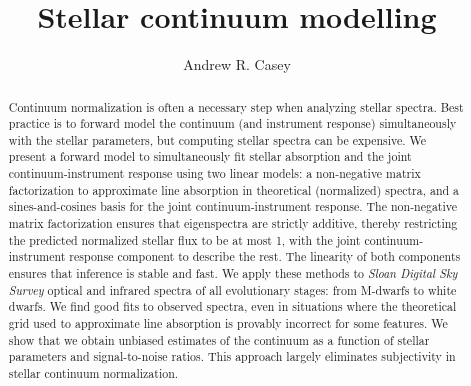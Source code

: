 \documentclass[modern]{aastex631}
\newcommand{\project}[1]{\textit{#1}}
\begin{document}
\title{\Huge Stellar continuum modelling}

\author[0000-0003-0174-0564]{Andrew R. Casey}



\begin{abstract}\noindent
Continuum normalization is often a necessary step when analyzing stellar spectra. Best practice is to forward model the continuum (and instrument response) simultaneously with the stellar parameters, but computing stellar spectra can be expensive.
We present a forward model to simultaneously fit stellar absorption and the joint continuum-instrument response using two linear models: a non-negative matrix factorization to approximate line absorption in theoretical (normalized) spectra, and a sines-and-cosines basis for the joint continuum-instrument response.
The non-negative matrix factorization ensures that eigenspectra are strictly additive, thereby restricting the predicted normalized stellar flux to be at most 1, with the joint continuum-instrument response component to describe the rest.
The linearity of both components ensures that inference is stable and fast.
We apply these methods to \project{Sloan Digital Sky Survey} optical and infrared spectra of all evolutionary stages: from M-dwarfs to white dwarfs.
We find good fits to observed spectra, even in situations where the theoretical grid used to approximate line absorption is provably incorrect for some features.
We show that we obtain unbiased estimates of the continuum as a function of stellar parameters and signal-to-noise ratios.
This approach largely eliminates subjectivity in stellar continuum normalization.
\end{abstract}


\section*{}\clearpage
\end{document}
